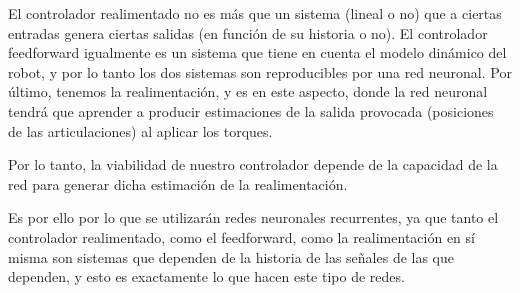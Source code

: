 El controlador realimentado no es más que un sistema (lineal o no) que a ciertas entradas genera ciertas salidas (en función de su historia o no). El controlador feedforward igualmente es un sistema que tiene en cuenta el modelo dinámico del robot, y por lo tanto los dos sistemas son reproducibles por una red neuronal. Por último, tenemos la realimentación, y es en este aspecto, donde la red neuronal tendrá que aprender a producir estimaciones de la salida provocada (posiciones de las articulaciones) al aplicar los torques.

Por lo tanto, la viabilidad de nuestro controlador depende de la capacidad de la red para generar dicha estimación de la realimentación.

Es por ello por lo que se utilizarán redes neuronales recurrentes, ya que tanto el controlador realimentado, como el feedforward, como la realimentación en sí misma son sistemas que dependen de la historia de las señales de las que dependen, y esto es exactamente lo que hacen este tipo de redes.



